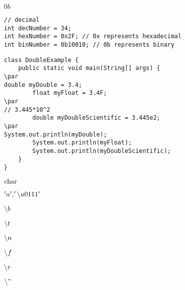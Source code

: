 \documentclass{book}
\def\lthtmlcheckvsize{\ifdim\ht\sizebox<\vsize 
  \ifdim\wd\sizebox<\hsize\expandafter\hfill\fi \expandafter\vfill
  \else\expandafter\vss\fi}%
\begin{document}
{\newpage\clearpage
{}%
$0b$%
\lthtmlindisplaymathZ
\lthtmlcheckvsize\clearpage}

{\newpage\clearpage
{}%
\begin{lstlisting}
// decimal
int decNumber = 34;
int hexNumber = 0x2F; // 0x represents hexadecimal
int binNumber = 0b10010; // 0b represents binary
\end{lstlisting}%
\lthtmlfigureZ
\lthtmlcheckvsize\clearpage}

{\newpage\clearpage
{}%
\begin{lstlisting}
class DoubleExample {
    public static void main(String[] args) {
\par
double myDouble = 3.4;
        float myFloat = 3.4F;
\par
// 3.445*10^2
        double myDoubleScientific = 3.445e2;
\par
System.out.println(myDouble);
        System.out.println(myFloat);
        System.out.println(myDoubleScientific);
    }
}
\end{lstlisting}%
\lthtmlfigureZ
\lthtmlcheckvsize\clearpage}

{\newpage\clearpage
{}%
$\lstinline{char}$%
\lthtmlindisplaymathZ
\lthtmlcheckvsize\clearpage}

{\newpage\clearpage
{}%
$'a', '\symbol{92}u0111'$%
\lthtmlindisplaymathZ
\lthtmlcheckvsize\clearpage}

{\newpage\clearpage
{}%
$\symbol{92}b$%
\lthtmlindisplaymathZ
\lthtmlcheckvsize\clearpage}

{\newpage\clearpage
{}%
$\symbol{92}t$%
\lthtmlindisplaymathZ
\lthtmlcheckvsize\clearpage}

{\newpage\clearpage
{}%
$\symbol{92}n$%
\lthtmlindisplaymathZ
\lthtmlcheckvsize\clearpage}

{\newpage\clearpage
{}%
$\symbol{92}f$%
\lthtmlindisplaymathZ
\lthtmlcheckvsize\clearpage}

{\newpage\clearpage
{}%
$\symbol{92}r$%
\lthtmlindisplaymathZ
\lthtmlcheckvsize\clearpage}

{\newpage\clearpage
{}%
$\symbol{92}"$%
\lthtmlindisplaymathZ
\lthtmlcheckvsize\clearpage}
\end{document}

